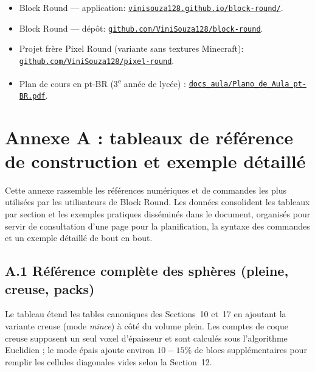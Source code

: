 \documentclass[12pt,a4paper]{scrartcl}
\newcommand{\biblink}[2]{\href{#1}{\nolinkurl{#2}}}
\begin{document}
\begin{itemize}[leftmargin=1.4em,itemsep=0.3em,topsep=0.3em]
  \item Block Round --- application: \biblink{https://vinisouza128.github.io/block-round/}{vinisouza128.github.io/block-round/}.
  \item Block Round --- dépôt: \biblink{https://github.com/ViniSouza128/block-round}{github.com/ViniSouza128/block-round}.
  \item Projet frère Pixel Round (variante sans textures Minecraft):
        \biblink{https://github.com/ViniSouza128/pixel-round}{github.com/ViniSouza128/pixel-round}.
  \item Plan de cours en pt-BR (3\textsuperscript{e} année de lycée) :
        \biblink{https://vinisouza128.github.io/block-round/docs_aula/Plano_de_Aula_pt-BR.pdf}{docs\_aula/Plano\_de\_Aula\_pt-BR.pdf}.
\end{itemize}


\clearpage

\section*{\color{accent}Annexe A : tableaux de référence de construction et exemple détaillé}

Cette annexe rassemble les références numériques et de commandes les plus utilisées par les utilisateurs de Block Round. Les données consolident les tableaux par section et les exemples pratiques disséminés dans le document, organisés pour servir de consultation d'une page pour la planification, la syntaxe des commandes et un exemple détaillé de bout en bout.

\subsection*{A.1 Référence complète des sphères (pleine, creuse, packs)}
Le tableau étend les tables canoniques des Sections~10 et~17 en ajoutant la variante creuse (mode \emph{mince}) à côté du volume plein. Les comptes de coque creuse supposent un seul voxel d'épaisseur et sont calculés sous l'algorithme Euclidien ; le mode épais ajoute environ $10{-}15\%$ de blocs supplémentaires pour remplir les cellules diagonales vides selon la Section~12.
\end{document}
